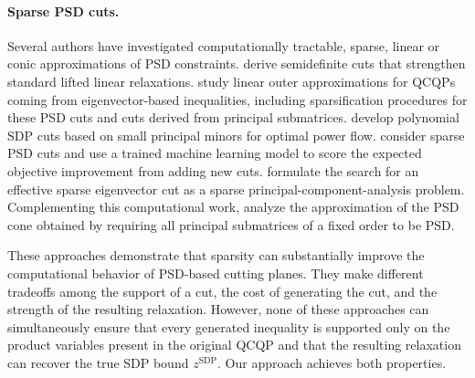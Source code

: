 \documentclass[twoside]{article}
\newcommand{\matip}[2]{#1 \bullet #2}
\newcommand{\citet}[1]{\cite{#1}}
\begin{document}
	
	\paragraph{Sparse PSD cuts.}
	Several authors have investigated computationally tractable, sparse, linear or conic approximations of PSD constraints. \citet{sherali.fraticelli:02} derive semidefinite cuts that strengthen standard lifted linear relaxations.  \citet{qualizza.belotti.margot:12} study linear outer approximations for QCQPs coming from eigenvector-based inequalities, including sparsification procedures for these PSD cuts and cuts derived from principal submatrices.  \citet{hijazi.coffrin.vanhentenryck:16} develop polynomial SDP cuts based on small principal minors for optimal power flow.  \citet{baltean-lugojan.et.al:19} consider sparse PSD cuts and use a trained machine learning model to score the expected objective improvement from adding new cuts.  \citet{dey.et.al:22} formulate the search for an effective sparse eigenvector cut as a sparse principal-component-analysis problem.  Complementing this computational work, \citet{blekherman.et.al:22} analyze the approximation of the PSD cone obtained by requiring all principal submatrices of a fixed order to be PSD.
	
	These approaches demonstrate that sparsity can substantially improve the computational behavior of PSD-based cutting planes.  They make different tradeoffs among the support of a cut, the cost of generating the cut, and the strength of the resulting relaxation. However, none of these approaches can simultaneously ensure that every generated inequality is supported only on the product variables present in the original QCQP and that the resulting relaxation can recover the true SDP bound $z^{\mathrm{SDP}}$.  Our approach achieves both properties.
	
\end{document}
